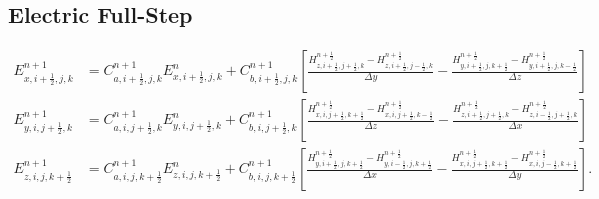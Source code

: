 \documentclass{article}
\numberwithin{equation}{section}
\numberwithin{figure}{section}
\begin{document}
\subsection{Electric Full-Step}
\begin{subequations}\label{eq:fdtd-e-full}
    \begin{align}
        E_{x,i+\frac{1}{2},j,k}^{n+1} & = C_{a,i+\frac{1}{2},j,k}^{n+1} E_{x,i+\frac{1}{2},j,k}^n + C_{b,i+\frac{1}{2},j,k}^{n+1} \left[\frac{H_{z,i+\frac{1}{2},j+\frac{1}{2},k}^{n+\frac{1}{2}}-H_{z,i+\frac{1}{2},j-\frac{1}{2},k}^{n+\frac{1}{2}}}{\Delta y} - \frac{H_{y,i+\frac{1}{2},j,k+\frac{1}{2}}^{n+\frac{1}{2}}-H_{y,i+\frac{1}{2},j,k-\frac{1}{2}}^{n+\frac{1}{2}}}{\Delta z}\right]
        \label{eq:fdtd-ex}                                                                                                                                                                                                                                                                                                                                                                          \\
        E_{y,i,j+\frac{1}{2},k}^{n+1} & = C_{a,i,j+\frac{1}{2},k}^{n+1} E_{y,i,j+\frac{1}{2},k}^n + C_{b,i,j+\frac{1}{2},k}^{n+1} \left[\frac{H_{x,i,j+\frac{1}{2},k+\frac{1}{2}}^{n+\frac{1}{2}}-H_{x,i,j+\frac{1}{2},k-\frac{1}{2}}^{n+\frac{1}{2}}}{\Delta z} - \frac{H_{z,i+\frac{1}{2},j+\frac{1}{2},k}^{n+\frac{1}{2}}-H_{z,i-\frac{1}{2},j+\frac{1}{2},k}^{n+\frac{1}{2}}}{\Delta x}\right]
        \label{eq:fdtd-ey}                                                                                                                                                                                                                                                                                                                                                                          \\
        E_{z,i,j,k+\frac{1}{2}}^{n+1} & = C_{a,i,j,k+\frac{1}{2}}^{n+1} E_{z,i,j,k+\frac{1}{2}}^n + C_{b,i,j,k+\frac{1}{2}}^{n+1} \left[\frac{H_{y,i+\frac{1}{2},j,k+\frac{1}{2}}^{n+\frac{1}{2}}-H_{y,i-\frac{1}{2},j,k+\frac{1}{2}}^{n+\frac{1}{2}}}{\Delta x} - \frac{H_{x,i,j+\frac{1}{2},k+\frac{1}{2}}^{n+\frac{1}{2}}-H_{x,i,j-\frac{1}{2},k+\frac{1}{2}}^{n+\frac{1}{2}}}{\Delta y}\right].
        \label{eq:fdtd-ez}
    \end{align}
\end{subequations}
\end{document}
